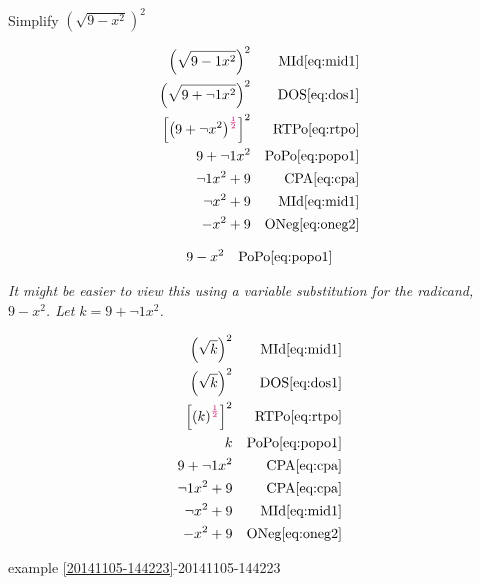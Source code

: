 \documentclass[20150903-160354-rs2.2-MarksMathNotebook.tex]{subfiles}
\begin{document}
\begin{example}[id:20141107-121834] \label{20141107-121834}  \hfill \\

Simplify $\left(\sqrt{9-x^2}\right)^2$

\soln

\solnsteps
\begin{align*}
\left(\sqrt{9-1x^2}\right)^2 && \text{MId} \eqref{eq:mid1} \\
\left(\sqrt{9+\neg 1x^2}\right)^2 && \text{DOS} \eqref{eq:dos1} \\
\left[\left(9+\neg x^2\right)^{\alert{\frac{1}{2}}} \right]^2 && \text{RTPo} \eqref{eq:rtpo} \\
9+\neg 1 x^2 && \text{PoPo} \eqref{eq:popo1} \\
\neg 1 x^2 + 9 && \text{CPA} \eqref{eq:cpa} \\
\neg x^2 + 9 && \text{MId} \eqref{eq:mid1} \\
-x^2+9 && \text{ONeg} \eqref{eq:oneg2}
\end{align*}

\soln

\lesssteps
\begin{align*}
9-x^2 && \text{PoPo} \eqref{eq:popo1}
\end{align*}


\emph{It might be easier to view this using a variable substitution for the radicand, $9-x^2$. Let $k=9+\neg 1x^2$.}

\begin{align*}
\left(\sqrt{k}\right)^2 && \text{MId} \eqref{eq:mid1} \\
\left(\sqrt{k}\right)^2 && \text{DOS} \eqref{eq:dos1} \\
\left[\left(k\right)^{\alert{\frac{1}{2}}} \right]^2 && \text{RTPo} \eqref{eq:rtpo} \\
k && \text{PoPo} \eqref{eq:popo1} \\
9 + \neg 1 x^2  && \text{CPA} \eqref{eq:cpa} \\
\neg 1 x^2 + 9 && \text{CPA} \eqref{eq:cpa} \\
\neg x^2 + 9 && \text{MId} \eqref{eq:mid1} \\
-x^2+9 && \text{ONeg} \eqref{eq:oneg2}
\end{align*}

\qdepend

\qdependlist
example \ref{20141105-144223}-20141105-144223


\end{example}
\end{document}
